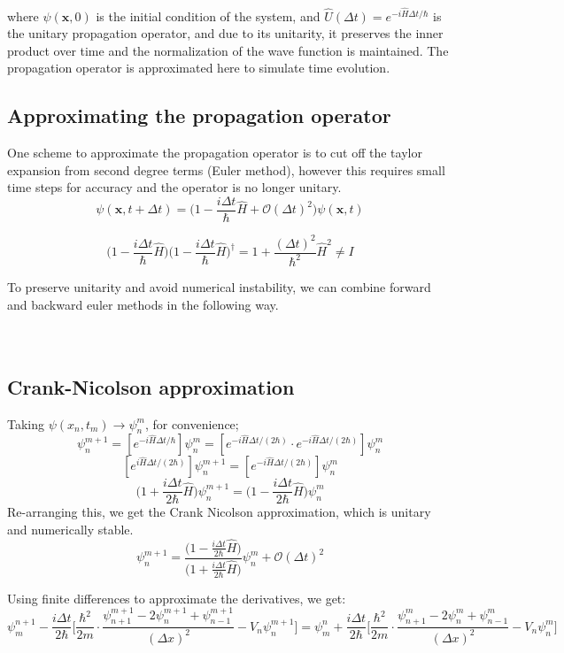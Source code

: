 \documentclass{article}
\begin{document}
where $\psi(\textbf{x},0)$ is the initial condition of the system, and $\hat{U}(\Delta t) = e^{-i\hat{H}\Delta t/\hbar}$ is the unitary propagation operator, and due to its unitarity, it preserves the inner product over time and the normalization of the wave function is maintained. The propagation operator is approximated here to simulate time evolution.

\subsection{Approximating the propagation operator}
One scheme to approximate the propagation operator is to cut off the taylor expansion from second degree terms (Euler method), however this requires small time steps for accuracy and the operator is no longer unitary.
$$\psi(\mathbf{x},t+\Delta t) = \bigg (1-\frac{i\Delta t}{\hbar}\hat{H} + \mathcal{O}(\Delta t)^2 \bigg ) \psi(\mathbf{x},t)$$

$$\bigg (1-\frac{i\Delta t}{\hbar}\hat{H} \bigg )\bigg (1-\frac{i\Delta t}{\hbar}\hat{H} \bigg )^\dagger = 1 + \frac{(\Delta t)^2}{\hbar^2} \hat{H}^2 \neq I$$

To preserve unitarity and avoid numerical instability, we can combine forward and backward euler methods in the following way.
\\
\\
\\
\subsection{Crank-Nicolson approximation}
Taking $\psi(x_n,t_m) \rightarrow \psi_n^m$, for convenience; 
$$\psi_n^{m+1} = [e^{-i\hat{H}\Delta t/\hbar}] \psi_n^m = [e^{-i\hat{H}\Delta t/(2\hbar)}\cdot e^{-i\hat{H}\Delta t/(2\hbar)}] \psi_n^m$$
$$[e^{i\hat{H}\Delta t/(2\hbar)}] \psi_n^{m+1} = [e^{-i\hat{H}\Delta t/(2\hbar)}] \psi_n^m$$
$$\bigg (1  +\frac{i\Delta t}{2\hbar}\hat{H} \bigg )\psi_n^{m+1} = \bigg (1-\frac{i\Delta t}{2\hbar}\hat{H} \bigg )\psi_n^m$$
Re-arranging this, we get the Crank Nicolson approximation, which is unitary and numerically stable.
$$\psi_n^{m+1} = \frac{\bigg (1-\frac{i\Delta t}{2\hbar}\hat{H} \bigg )}{\bigg (1+\frac{i\Delta t}{2\hbar}\hat{H} \bigg )} \psi_n^{m} + \mathcal{O}(\Delta t)^2$$

\newpage
Using finite differences to approximate the derivatives, we get:
$$\psi_m^{n+1} - \frac{i\Delta t}{2\hbar} \bigg[\frac{\hbar^2}{2m}\cdot \frac{\psi_{n+1}^{m+1} -2\psi_n^{m+1} +\psi_{n-1}^{m+1}}{(\Delta x)^2} - V_n\psi_n^{m+1} \bigg] =  \psi_m^{n} + \frac{i\Delta t}{2\hbar} \bigg[\frac{\hbar^2}{2m}\cdot \frac{\psi_{n+1}^{m} -2\psi_n^{m} +\psi_{n-1}^{m}}{(\Delta x)^2} - V_n\psi_n^{m} \bigg] $$
\end{document}
